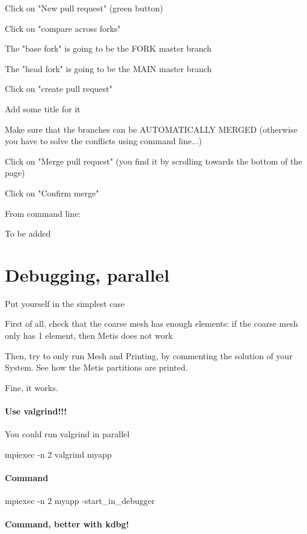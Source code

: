 \documentclass[10pt]{book}
\begin{document}
Click on "New pull request" (green button)

Click on "compare across forks"

The "base fork" is going to be the FORK master branch

The "head fork" is going to be the MAIN master branch

Click on "create pull request"

Add some title for it

Make sure that the branches can be AUTOMATICALLY MERGED (otherwise you have to solve the conflicts using command 
line...)

Click on "Merge pull request" (you find it by scrolling towards the bottom of the page)

Click on "Confirm merge"

From command line:

To be added

 
 
  \chapter{Debugging, parallel}
 
 Put yourself in the simplest case
 
 First of all, check that the coarse mesh has enough elements: if the coarse mesh only has 1 element, then Metis does not work
 
 Then, try to only run Mesh and Printing, by commenting the solution of your System. See how the Metis partitions are printed.
 
 Fine, it works.
 
  \subsubsection{Use valgrind!!!}
  
  You could run valgrind in parallel
  
 mpiexec -n 2 valgrind myapp
  
  

 \subsubsection{Command}

 mpiexec -n 2 myapp -start\_in\_debugger
 
 \subsubsection{Command, better with kdbg!}
\end{document}
